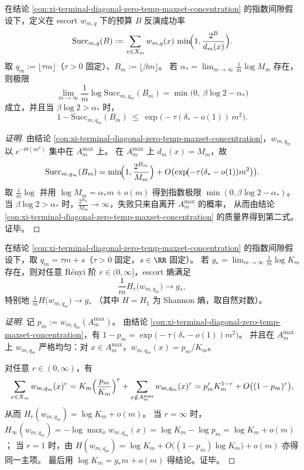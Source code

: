 \begin{conclusion}[对角 escort 的预言机相图：预算 \texorpdfstring{$B=\beta m$}{B=beta m} 的成功率在 \(m\) 尺度仅由 \texorpdfstring{$\alpha_\ast$}{alpha*} 决定]\label{con:xi-terminal-diagonal-escort-oracle-phase}
在结论 \ref{con:xi-terminal-diagonal-zero-temp-maxset-concentration} 的指数间隙假设下，定义在 escort \(w_{m,q}\) 下的预算 \(B\) 反演成功率
\[
\mathrm{Succ}_{m,q}(B)
:=\sum_{x\in X_m}w_{m,q}(x)\,\min\!\Bigl(1,\frac{2^{B}}{d_m(x)}\Bigr).
\]
取 \(q_m:=\lfloor\tau m\rfloor\)（\(\tau>0\) 固定）、\(B_m:=\lfloor\beta m\rfloor\)。
若 \(\alpha_\ast=\lim_{m\to\infty}\frac{1}{m}\log M_m\) 存在，则极限
\[
\lim_{m\to\infty}\frac{1}{m}\log \mathrm{Succ}_{m,q_m}(B_m)
=\min\bigl(0,\ \beta\log 2-\alpha_\ast\bigr)
\]
成立，并且当 \(\beta\log 2>\alpha_\ast\) 时，
\[
1-\mathrm{Succ}_{m,q_m}(B_m)\ \le\ \exp\!\bigl(-\tau(\delta_\ast-o(1))\,m^2\bigr).
\]
\end{conclusion}
\begin{proof}[证明]
由结论 \ref{con:xi-terminal-diagonal-zero-temp-maxset-concentration}，\(w_{m,q_m}\) 以 \(e^{-\Theta(m^2)}\) 集中在 \(A_m^{\max}\) 上。
在 \(A_m^{\max}\) 上 \(d_m(x)=M_m\)，故
\[
\mathrm{Succ}_{m,q_m}(B_m)
=\min\!\Bigl(1,\frac{2^{B_m}}{M_m}\Bigr)+O\bigl(\exp\!\bigl(-\tau(\delta_\ast-o(1))m^2\bigr)\bigr).
\]
取 \(\frac1m\log\) 并用 \(\log M_m=\alpha_\ast m+o(m)\) 得到指数极限
\(
\min(0,\beta\log 2-\alpha_\ast)
\)。
当 \(\beta\log2>\alpha_\ast\) 时，\(\frac{2^{B_m}}{M_m}\to\infty\)，失败只来自离开 \(A_m^{\max}\) 的概率，
从而由结论 \ref{con:xi-terminal-diagonal-zero-temp-maxset-concentration} 的质量界得到第二式。证毕。
\end{proof}

\begin{conclusion}[对角熵平台：当 \texorpdfstring{$q=\tau m+O(1)$}{q=tau m+O(1)} 时 escort 的 Shannon 与 Rényi 熵率均塌缩为 \texorpdfstring{$g_\ast$}{g*}]\label{con:xi-terminal-diagonal-escort-entropy-plateau}
在结论 \ref{con:xi-terminal-diagonal-zero-temp-maxset-concentration} 的指数间隙假设下，取 \(q_m=\tau m+s\)（\(\tau>0\) 固定，\(s\in\RR\) 固定）。
若 \(g_\ast=\lim_{m\to\infty}\frac{1}{m}\log K_m\) 存在，则对任意 Rényi 阶 \(r\in(0,\infty]\)，escort 熵满足
\[
\frac{1}{m}H_r\!\bigl(w_{m,q_m}\bigr)\longrightarrow g_\ast,
\]
特别地
\(
\frac{1}{m}H\!\bigl(w_{m,q_m}\bigr)\to g_\ast
\)
（其中 \(H=H_1\) 为 Shannon 熵，取自然对数）。
\end{conclusion}
\begin{proof}[证明]
记 \(p_m:=w_{m,q_m}(A_m^{\max})\)。
由结论 \ref{con:xi-terminal-diagonal-zero-temp-maxset-concentration}，有 \(1-p_m=\exp\!\bigl(-\tau(\delta_\ast-o(1))m^2\bigr)\)。
并且在 \(A_m^{\max}\) 上 \(w_{m,q_m}\) 严格均匀：对 \(x\in A_m^{\max}\)，\(w_{m,q_m}(x)=p_m/K_m\)。
\par
对任意 \(r\in(0,\infty)\)，有
\[
\sum_{x\in X_m}w_{m,q_m}(x)^r
=K_m\Bigl(\frac{p_m}{K_m}\Bigr)^r+\sum_{x\notin A_m^{\max}}w_{m,q_m}(x)^r
=p_m^rK_m^{1-r}+O\bigl((1-p_m)^r\bigr),
\]
从而
\(
H_r(w_{m,q_m})=\log K_m+o(m)
\)。
当 \(r=\infty\) 时，
\(
H_\infty(w_{m,q_m})=-\log\max_x w_{m,q_m}(x)=\log K_m-\log p_m=\log K_m+o(m)
\)；
当 \(r=1\) 时，由
\(
H(w_{m,q_m})=\log K_m+O\bigl((1-p_m)\log K_m\bigr)+o(m)
\)
亦得同一主项。
最后用 \(\log K_m=g_\ast m+o(m)\) 得结论。证毕。
\end{proof}

